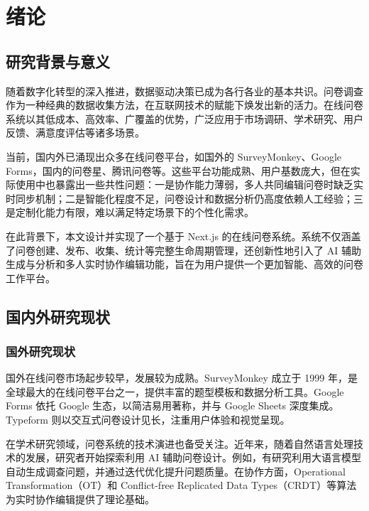 \setcounter{page}{1}

\section{绪论}

\subsection{研究背景与意义}

随着数字化转型的深入推进，数据驱动决策已成为各行各业的基本共识。问卷调查作为一种经典的数据收集方法，在互联网技术的赋能下焕发出新的活力。在线问卷系统以其低成本、高效率、广覆盖的优势，广泛应用于市场调研、学术研究、用户反馈、满意度评估等诸多场景。

当前，国内外已涌现出众多在线问卷平台，如国外的 SurveyMonkey、Google Forms，国内的问卷星、腾讯问卷等。这些平台功能成熟、用户基数庞大，但在实际使用中也暴露出一些共性问题：一是协作能力薄弱，多人共同编辑问卷时缺乏实时同步机制；二是智能化程度不足，问卷设计和数据分析仍高度依赖人工经验；三是定制化能力有限，难以满足特定场景下的个性化需求。

在此背景下，本文设计并实现了一个基于 Next.js 的在线问卷系统。系统不仅涵盖了问卷创建、发布、收集、统计等完整生命周期管理，还创新性地引入了 AI 辅助生成与分析和多人实时协作编辑功能，旨在为用户提供一个更加智能、高效的问卷工作平台。

\subsection{国内外研究现状}

\subsubsection{国外研究现状}

国外在线问卷市场起步较早，发展较为成熟。SurveyMonkey 成立于 1999 年，是全球最大的在线问卷平台之一，提供丰富的题型模板和数据分析工具。Google Forms 依托 Google 生态，以简洁易用著称，并与 Google Sheets 深度集成。Typeform 则以交互式问卷设计见长，注重用户体验和视觉呈现。

在学术研究领域，问卷系统的技术演进也备受关注。近年来，随着自然语言处理技术的发展，研究者开始探索利用 AI 辅助问卷设计。例如，有研究利用大语言模型自动生成调查问题，并通过迭代优化提升问题质量。在协作方面，Operational Transformation（OT）和 Conflict-free Replicated Data Types（CRDT）等算法为实时协作编辑提供了理论基础。

